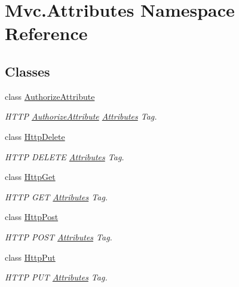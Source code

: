\hypertarget{namespace_mvc_1_1_attributes}{}\section{Mvc.\+Attributes Namespace Reference}
\label{namespace_mvc_1_1_attributes}
\subsection*{Classes}
\begin{DoxyCompactItemize}
\item 
class \hyperlink{class_mvc_1_1_attributes_1_1_authorize_attribute}{Authorize\+Attribute}
\begin{DoxyCompactList}\small\item\em H\+T\+TP \hyperlink{class_mvc_1_1_attributes_1_1_authorize_attribute}{Authorize\+Attribute} \hyperlink{namespace_mvc_1_1_attributes}{Attributes} Tag. \end{DoxyCompactList}\item 
class \hyperlink{class_mvc_1_1_attributes_1_1_http_delete}{Http\+Delete}
\begin{DoxyCompactList}\small\item\em H\+T\+TP D\+E\+L\+E\+TE \hyperlink{namespace_mvc_1_1_attributes}{Attributes} Tag. \end{DoxyCompactList}\item 
class \hyperlink{class_mvc_1_1_attributes_1_1_http_get}{Http\+Get}
\begin{DoxyCompactList}\small\item\em H\+T\+TP G\+ET \hyperlink{namespace_mvc_1_1_attributes}{Attributes} Tag. \end{DoxyCompactList}\item 
class \hyperlink{class_mvc_1_1_attributes_1_1_http_post}{Http\+Post}
\begin{DoxyCompactList}\small\item\em H\+T\+TP P\+O\+ST \hyperlink{namespace_mvc_1_1_attributes}{Attributes} Tag. \end{DoxyCompactList}\item 
class \hyperlink{class_mvc_1_1_attributes_1_1_http_put}{Http\+Put}
\begin{DoxyCompactList}\small\item\em H\+T\+TP P\+UT \hyperlink{namespace_mvc_1_1_attributes}{Attributes} Tag. \end{DoxyCompactList}\end{DoxyCompactItemize}
